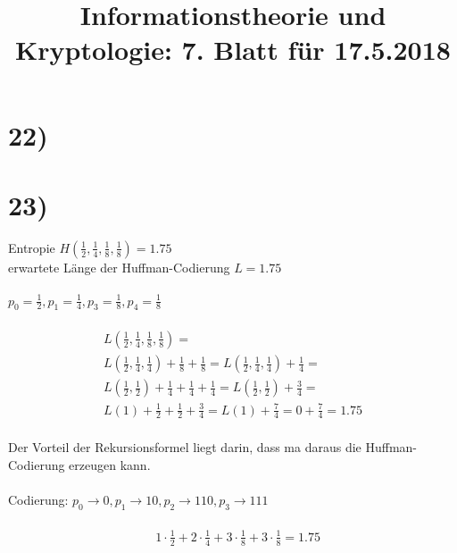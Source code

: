 %



  \title{Informationstheorie und Kryptologie: 7. Blatt für 17.5.2018}
  \maketitle

  \section*{22)}

  

  \section*{23)}

  Entropie $H(\frac{1}{2}, \frac{1}{4}, \frac{1}{8}, \frac{1}{8}) = 1.75$\\
  erwartete Länge der Huffman-Codierung $L = 1.75$\\
  \\
  $p_0 = \frac{1}{2}, p_1 = \frac{1}{4}, p_3 = \frac{1}{8}, p_4 = \frac{1}{8}$\\
  \\
  \begin{align*}
    & L(\frac{1}{2}, \frac{1}{4}, \frac{1}{8}, \frac{1}{8}) = &\\
    & L(\frac{1}{2}, \frac{1}{4}, \frac{1}{4}) + \frac{1}{8} + \frac{1}{8} = L(\frac{1}{2}, \frac{1}{4}, \frac{1}{4}) + \frac{1}{4} =\\ 
    & L(\frac{1}{2}, \frac{1}{2}) + \frac{1}{4} + \frac{1}{4} + \frac{1}{4} = L(\frac{1}{2}, \frac{1}{2}) + \frac{3}{4} =\\
    & L(1) + \frac{1}{2} + \frac{1}{2} + \frac{3}{4} = L(1) + \frac{7}{4} = 0 + \frac{7}{4} = 1.75
  \end{align*}
  \\
  Der Vorteil der Rekursionsformel liegt darin, dass ma daraus die Huffman-Codierung erzeugen kann.\\
  \\
  Codierung: $p_0 \rightarrow 0, p_1 \rightarrow 10, p_2 \rightarrow 110, p_3 \rightarrow 111$\\
  \\
  \begin{align*}
    & 1 \cdot \frac{1}{2} + 2 \cdot \frac{1}{4} + 3 \cdot \frac{1}{8} + 3 \cdot \frac{1}{8} = 1.75
  \end{align*}

